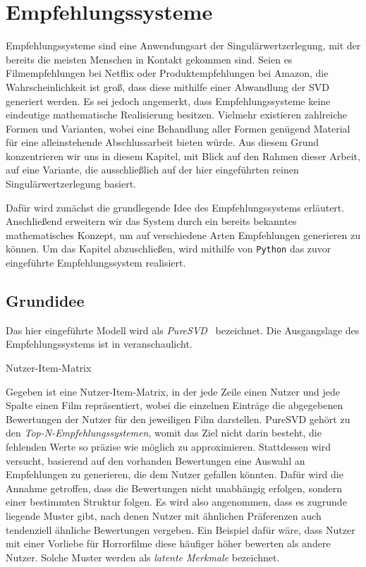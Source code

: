 \chapter{Empfehlungssysteme}\label{chap:rec}

Empfehlungssysteme sind eine Anwendungsart der Singulärwertzerlegung, mit der bereits die meisten Menschen in Kontakt gekommen sind.
Seien es Filmempfehlungen bei Netflix oder Produktempfehlungen bei Amazon, die Wahrscheinlichkeit ist groß, dass diese mithilfe einer Abwandlung der SVD generiert werden.
Es sei jedoch angemerkt, dass Empfehlungssysteme keine eindeutige mathematische Realisierung besitzen.
Vielmehr existieren zahlreiche Formen und Varianten, wobei eine Behandlung aller Formen genügend Material für eine alleinstehende Abschlussarbeit bieten würde.
Aus diesem Grund konzentrieren wir uns in diesem Kapitel, mit Blick auf den Rahmen dieser Arbeit, auf eine Variante, die ausschließlich auf der hier eingeführten reinen Singulärwertzerlegung basiert.

Dafür wird zunächst die grundlegende Idee des Empfehlungssystems erläutert.
Anschließend erweitern wir das System durch ein bereits bekanntes mathematisches Konzept, um auf verschiedene Arten Empfehlungen generieren zu können.
Um das Kapitel abzuschließen, wird mithilfe von \texttt{Python} das zuvor eingeführte Empfehlungssystem realisiert.

\section{Grundidee}

Das hier eingeführte Modell wird als \emph{PureSVD}~\cite{cremonesiPerformanceRecommenderAlgorithms2010a} bezeichnet. 
Die Ausgangslage des Empfehlungssystems ist in  veranschaulicht.
\begin{table}[tb]
    \centering
    \caption{Nutzer-Item-Matrix}\label{tab:rec:usit}
    
\end{table}

Gegeben ist eine Nutzer-Item-Matrix, in der jede Zeile einen Nutzer und jede Spalte einen Film repräsentiert, wobei die einzelnen Einträge die abgegebenen Bewertungen der Nutzer für den jeweiligen Film darstellen.
PureSVD gehört zu den \emph{Top-N-Empfehlungssystemen}, womit das Ziel nicht darin besteht, die fehlenden Werte so präzise wie möglich zu approximieren.
Stattdessen wird versucht, basierend auf den vorhanden Bewertungen eine Auswahl an Empfehlungen zu generieren, die dem Nutzer gefallen könnten.
Dafür wird die Annahme getroffen, dass die Bewertungen nicht unabhängig erfolgen, sondern einer bestimmten Struktur folgen.
Es wird also angenommen, dass es zugrunde liegende Muster gibt, nach denen Nutzer mit ähnlichen Präferenzen auch tendenziell ähnliche Bewertungen vergeben.
Ein Beispiel dafür wäre, dass Nutzer mit einer Vorliebe für Horrorfilme diese häufiger höher bewerten als andere Nutzer.
Solche Muster werden als \emph{latente Merkmale} bezeichnet.

